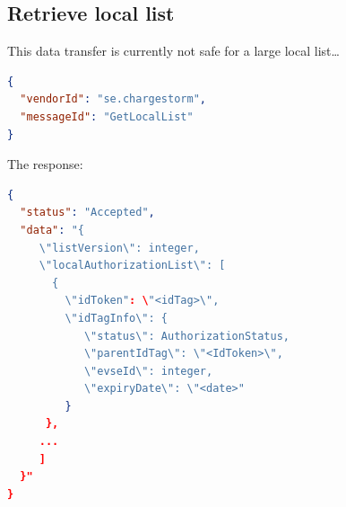 \documentclass{scrartcl}
\begin{document}
\subsection{Retrieve local list}
\label{sec:retrieve-local-list}

This data transfer is currently not safe for a large local list\ldots

\begin{lstlisting}[language=json,caption={DataTransfer.req for GetLocalList
sent to the CS},captionpos=t]
{
  "vendorId": "se.chargestorm",
  "messageId": "GetLocalList"
}
\end{lstlisting}

The response:

\begin{lstlisting}[language=json,caption={DataTransfer.conf for
GetLocalList sent from the CS},captionpos=t]
{
  "status": "Accepted",
  "data": "{
     \"listVersion\": integer,
     \"localAuthorizationList\": [
       {
         \"idToken": \"<idTag>\",
         \"idTagInfo\": {
            \"status\": AuthorizationStatus,
            \"parentIdTag\": \"<IdToken>\",
            \"evseId\": integer,
            \"expiryDate\": \"<date>"
         }
      },
     ...
     ]
  }"
}
\end{lstlisting}
\end{document}
